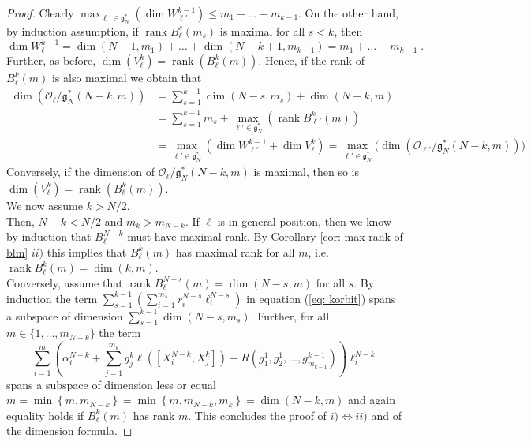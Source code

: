\documentclass[pdflatex,sn-mathphys-num]{sn-jnl}
\theoremstyle{thmstyletwo}
\theoremstyle{thmstyleone}
\theoremstyle{thmstyletwo}
\newcommand{\fancyg}{\mathfrak{g}}
\newcommand{\rank}{\operatorname{rank}}
\begin{document}
\begin{proof}
		Clearly $\max_{\ell' \in \fancyg_{N}^*}\left(\operatorname{dim}W_{\ell'}^{k-1}\right)\leq m_1+\ldots + m_{k-1}$. On the other hand, by induction assumption, if $\operatorname{rank}B_{\ell}^s(m_s)$ is maximal for all $s<k$, then $$\operatorname{dim}W_{\ell}^{k-1} = \operatorname{dim}(N-1,m_1)+\ldots + \operatorname{dim}(N-k+1,m_{k-1})=m_1+\ldots + m_{k-1} \;.$$
		Further, as before, $\dim(V_{\ell}^k) =\operatorname{rank}(B_{\ell}^k(m))$. Hence, if the rank of $B_{\ell}^k(m)$ is also maximal we obtain that
		\begin{align*}
			\operatorname{dim}\left(\mathcal{O}_{\ell} / \fancyg_N^*(N - k, m)\right)
			&= \sum_{s=1}^{k-1}\operatorname{dim}(N-s,m_s)+ \operatorname{dim}(N-k,m)\\
			&= \sum_{s=1}^{k-1}m_s+ \max_{\ell' \in \fancyg_{N}^*}\left(\rank B_{\ell'}^k(m)\right)\\
			&=\max_{\ell' \in \fancyg_{N}^*}\left(\dim W_{\ell'}^{k-1} + \dim V_{\ell}^k\right) = \max_{\ell' \in \fancyg_{N}^*}\big(\operatorname{dim}\left(\mathcal{O}_{\ell'} / \fancyg_N^*(N - k, m)\right) \big)
		\end{align*}
		Conversely, if the dimension of $\mathcal{O}_{\ell} / \fancyg_N^*(N - k, m)$ is maximal, then so is $\dim(V_{\ell}^k) = \operatorname{rank}(B_{\ell}^k(m))$\vspace{5pt}.\\
		We now assume $k>N/2$. \\
		Then, $N-k<N/2$ and $m_k>m_{N-k}$. If $\ell$ is in general position, then we know by induction that $B_{\ell}^{N-k}$ must have maximal rank. By Corollary \ref{cor: max rank of blm} $ii)$ this implies that $B_{\ell}^{k}(m)$ has maximal rank for all $m$, i.e. $\rank B_{\ell}^{k}(m) = \dim(k,m)$.\\
		Conversely, assume that $\operatorname{rank}B_{\ell}^{N-s}(m)=\dim(N-s,m)$ for all $s$. By induction the term $ \sum_{s = 1}^{k-1} \left(\sum_{i=1}^{m_s} r_i^{N-s} \ell_i^{N-s} \right)$ in equation (\ref{eq: korbit}) spans a subspace of dimension $\sum_{s =1}^{k-1}\dim(N-s,m_s)$. Further, for all $m \in \{1, \ldots, m_{N-k}\}$ the term
		\[\sum_{i=1}^{m} \left(\alpha_i^{N-k} + \sum_{j=1}^{m_k} g_j^k \ell([X_i^{N-k}, X_j^k]) + R(g_1^1,g_2^1, \ldots, g_{m_{k-1}}^{k-1})\right) \ell_i^{N-k}\]
		spans a subspace of dimension less or equal $m =\min\left\{m,m_{N-k}\right\} =\min\left\{m,m_{N-k},m_k\right\} = \dim(N-k,m)$ and again equality holds if $B_{\ell}^{k}(m)$ has rank $m$.
		This concludes the proof of $i) \iff ii)$ and of the dimension formula.
	\end{proof}
\end{document}

